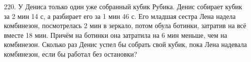 220. У Дениса только один уже собранный кубик Рубика. Денис собирает кубик за 2 мин 14 с, а разбирает его за 1 мин 46 с. Его младшая сестра Лена надела комбинезон, посмотрелась 2 мин в зеркало, потом обула ботинки, затратив на всё вместе 18 мин. Причём на ботинки она затратила на 6 мин меньше, чем на комбинезон. Сколько раз Денис успел бы собрать свой кубик, пока Лена надевала комбинезон, если бы работал без остановки?\\
